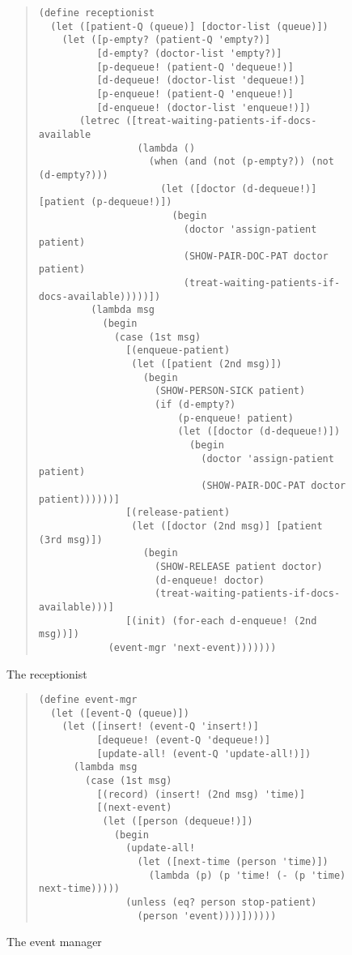 \begin{figure}
\begin{frameit}
\begin{quote}
\begin{verbatim}
(define receptionist
  (let ([patient-Q (queue)] [doctor-list (queue)])
    (let ([p-empty? (patient-Q 'empty?)]
          [d-empty? (doctor-list 'empty?)]
          [p-dequeue! (patient-Q 'dequeue!)]
          [d-dequeue! (doctor-list 'dequeue!)]
          [p-enqueue! (patient-Q 'enqueue!)]
          [d-enqueue! (doctor-list 'enqueue!)])
       (letrec ([treat-waiting-patients-if-docs-available
                 (lambda ()
                   (when (and (not (p-empty?)) (not (d-empty?)))
                     (let ([doctor (d-dequeue!)] [patient (p-dequeue!)])
                       (begin
                         (doctor 'assign-patient patient)
                         (SHOW-PAIR-DOC-PAT doctor patient)
                         (treat-waiting-patients-if-docs-available)))))])
         (lambda msg
           (begin
             (case (1st msg)
               [(enqueue-patient)
                (let ([patient (2nd msg)])
                  (begin
                    (SHOW-PERSON-SICK patient)
                    (if (d-empty?)
                        (p-enqueue! patient)
                        (let ([doctor (d-dequeue!)])
                          (begin
                            (doctor 'assign-patient patient)
                            (SHOW-PAIR-DOC-PAT doctor patient))))))]
               [(release-patient)
                (let ([doctor (2nd msg)] [patient (3rd msg)])
                  (begin
                    (SHOW-RELEASE patient doctor)
                    (d-enqueue! doctor)
                    (treat-waiting-patients-if-docs-available)))]
               [(init) (for-each d-enqueue! (2nd msg))])
            (event-mgr 'next-event)))))))
\end{verbatim}
\end{quote}
\caption{The receptionist}
\label{fig:recep}
\end{frameit}
\end{figure}
\begin{figure}
\begin{frameit}
\begin{quote}
\begin{verbatim}
(define event-mgr
  (let ([event-Q (queue)])
    (let ([insert! (event-Q 'insert!)]
          [dequeue! (event-Q 'dequeue!)]
          [update-all! (event-Q 'update-all!)])
      (lambda msg
        (case (1st msg)
          [(record) (insert! (2nd msg) 'time)]
          [(next-event)
           (let ([person (dequeue!)])
             (begin
               (update-all!
                 (let ([next-time (person 'time)])
                   (lambda (p) (p 'time! (- (p 'time) next-time)))))
               (unless (eq? person stop-patient)
                 (person 'event))))])))))
\end{verbatim}
\end{quote}
\caption{The event manager}
\label{fig:event}
\end{frameit}
\end{figure}

